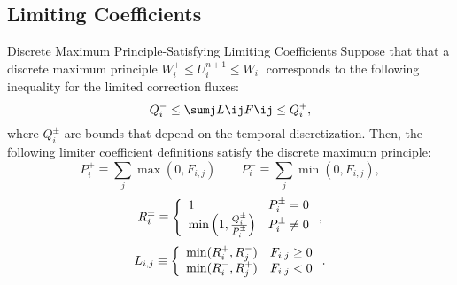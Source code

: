 \subsection{Limiting Coefficients}\label{L}
\begin{theorem}{Discrete Maximum Principle-Satisfying Limiting Coefficients}{}
   Suppose that that a discrete maximum principle $W_i^+\le U_i^{n+1}\le W_i^-$
   corresponds to the following inequality for the limited correction fluxes:
   \begin{equation}
      Q_i^- \le \sumj L\ij F\ij \le Q_i^+,
   \end{equation}
   where $Q_i^\pm$ are bounds that depend on the temporal discretization. Then,
   the following limiter coefficient definitions satisfy the discrete maximum
   principle:
   \begin{equation}\label{P_defs}
      P_i^+ \equiv \sum\limits_j\max(0,F_{i,j}) \qquad
      P_i^- \equiv \sum\limits_j\min(0,F_{i,j}),
   \end{equation}
   \begin{equation}\label{R_defs}
      R_i^\pm \equiv\left\{
         \begin{array}{l l}
            1                                          & P_i^\pm = 0\\
            \min\left(1,\frac{Q_i^\pm}{P_i^\pm}\right) & P_i^\pm \ne 0
         \end{array}
         \right.,
   \end{equation}
   \begin{equation}\label{L_defs}
      L_{i,j} \equiv\left\{
         \begin{array}{l l}
            \min(R_i^+,R_j^-) & F_{i,j} \geq 0\\
            \min(R_i^-,R_j^+) & F_{i,j} < 0
         \end{array}
         \right..
   \end{equation}  
\end{theorem}

